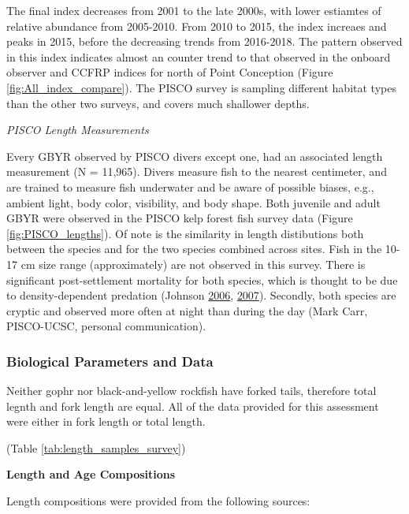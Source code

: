\documentclass[12pt,]{article}
\begin{document}
The final index decreases from 2001 to the late 2000s, with lower
estiamtes of relative abundance from 2005-2010. From 2010 to 2015, the
index increaes and peaks in 2015, before the decreasing trends from
2016-2018. The pattern observed in this index indicates almost an
counter trend to that observed in the onboard observer and CCFRP indices
for north of Point Conception (Figure \ref{fig:All_index_compare}). The
PISCO survey is sampling different habitat types than the other two
surveys, and covers much shallower depths.

\emph{PISCO Length Measurements}

Every GBYR observed by PISCO divers except one, had an associated length
measurement (N = 11,965). Divers measure fish to the nearest centimeter,
and are trained to measure fish underwater and be aware of possible
biases, e.g., ambient light, body color, visibility, and body shape.
Both juvenile and adult GBYR were observed in the PISCO kelp forest fish
survey data (Figure \ref{fig:PISCO_lengths}). Of note is the similarity
in length distibutions both between the species and for the two species
combined across sites. Fish in the 10-17 cm size range (approximately)
are not observed in this survey. There is significant post-settlement
mortality for both species, which is thought to be due to
density-dependent predation (Johnson
\protect\hyperlink{ref-Johnson2006}{2006},
\protect\hyperlink{ref-Johnson2007}{2007}). Secondly, both species are
cryptic and observed more often at night than during the day (Mark Carr,
PISCO-UCSC, personal communication).

\subsubsection{Biological Parameters and
Data}\label{biological-parameters-and-data}

Neither gophr nor black-and-yellow rockfish have forked tails, therefore
total legnth and fork length are equal. All of the data provided for
this assessment were either in fork length or total length.

(Table \ref{tab:length_samples_survey})

\textbf{Length and Age Compositions}

Length compositions were provided from the following sources:
\end{document}
